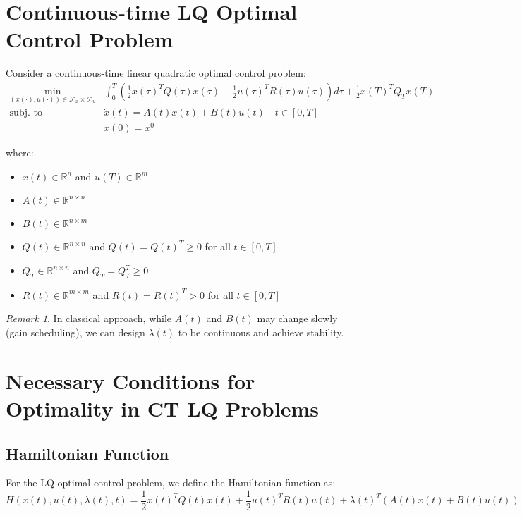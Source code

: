 \documentclass[openany]{book}
\theoremstyle{definition}
\theoremstyle{remark}
\newtheorem*{remark}{Remark}
\begin{document}
\section{Continuous-time LQ Optimal Control Problem}

Consider a continuous-time linear quadratic optimal control problem:
\begin{align*}
    \min_{(x(\cdot),u(\cdot))\in\mathcal{F}_x\times\mathcal{F}_u} &\int_0^T \left(\frac{1}{2}x(\tau)^TQ(\tau)x(\tau) + \frac{1}{2}u(\tau)^TR(\tau)u(\tau)\right)d\tau + \frac{1}{2}x(T)^TQ_Tx(T)\\
    \text{subj. to } & \dot{x}(t) = A(t)x(t) + B(t)u(t) \quad t \in [0,T]\\
    & x(0) = x^0
\end{align*}

where:
\begin{itemize}
    \item $x(t) \in \mathbb{R}^n$ and $u(T) \in \mathbb{R}^m$
    \item $A(t) \in \mathbb{R}^{n\times n}$
    \item $B(t) \in \mathbb{R}^{n\times m}$
    \item $Q(t) \in \mathbb{R}^{n\times n}$ and $Q(t) = Q(t)^T \geq 0$ for all $t \in [0,T]$
    \item $Q_T \in \mathbb{R}^{n\times n}$ and $Q_T = Q_T^T \geq 0$
    \item $R(t) \in \mathbb{R}^{m\times m}$ and $R(t) = R(t)^T > 0$ for all $t \in [0,T]$
\end{itemize}

\begin{remark}
In classical approach, while $A(t)$ and $B(t)$ may change slowly (gain scheduling), we can design $\lambda(t)$ to be continuous and achieve stability.
\end{remark}

\section{Necessary Conditions for Optimality in CT LQ Problems}

\subsection{Hamiltonian Function}
For the LQ optimal control problem, we define the Hamiltonian function as:
\[
    H(x(t),u(t),\lambda(t),t) = \frac{1}{2}x(t)^TQ(t)x(t) + \frac{1}{2}u(t)^TR(t)u(t) + \lambda(t)^T(A(t)x(t) + B(t)u(t))
\]
\end{document}
